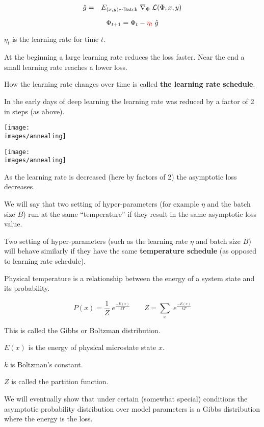 {\vfill
\begin{eqnarray*}
  \hat{g} & = & E_{(x,y) \sim \mathrm{Batch}}\;\nabla_\Phi\;{\cal L}(\Phi,x,y)
\end{eqnarray*}

$$\Phi_{t+1} = \Phi_t - {\color{red} \eta_t}\; \hat{g}$$


\vfill
\centerline{$\eta_t$ is the learning rate for time $t$.}



At the beginning a large learning rate reduces the loss faster. Near the end a small learning rate reaches a lower loss.

\vfill
How the learning rate changes over time is called {\bf the learning rate schedule}.

\vfill
In the early days of deep learning the learning rate was reduced by a factor of 2 in steps (as above).

\vfill
\centerline{\texttt{[image: \\images/annealing]}}


\centerline{\texttt{[image: \\images/annealing]}}

{\huge
\vfill
As the learning rate is decreased (here by factors of 2) the asymptotic loss decreases.

\vfill
We will say that two setting of hyper-parameters (for example $\eta$ and the batch size $B$) run at the same ``temperature'' if
they result in the same asymptotic loss value.

\vfill
Two setting of hyper-parameters (such as the learning rate $\eta$ and batch size $B$) will behave similarly if they have the same {\bf temperature schedule}
(as opposed to learning rate schedule).
}


{\huge
Physical temperature is a relationship between the energy of a system state and its probability.

\vfill
$$P(x) = \frac{1}{Z} \;e^{\frac{-E(x)}{kT}} \;\;\;\;\;\;\;Z = \sum_x\; e^{\frac{-E(x)}{kT}}$$

\vfill
This is called the Gibbs or Boltzman distribution.

\vfill
$E(x)$ is the energy of physical microstate state $x$.


\vfill
$k$ is Boltzman's constant.

\vfill
$Z$ is called the partition function.

\vfill
We will eventually show that under certain (somewhat special) conditions the asymptotic probability distribution over model parameters is a Gibbs distribution
where the energy is the loss.
}

}
